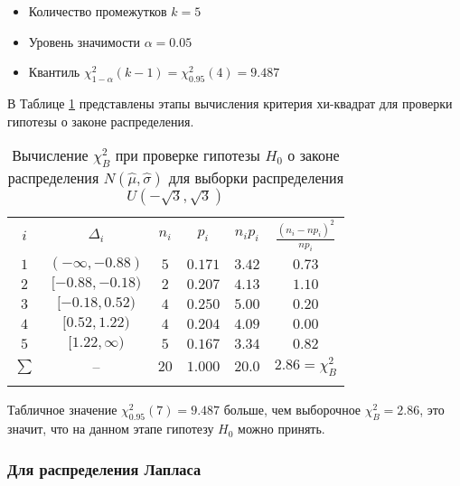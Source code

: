 \documentclass[12pt]{article}
\begin{document}
\begin{flushleft}
			\begin{itemize}
				\item Количество промежутков $k=5$
				\item Уровень значимости $\alpha = 0.05$
				\item Квантиль $\chi^2_{1-\alpha}(k-1) = \chi^2_{0.95}(4) = 9.487$
			\end{itemize}

			В Таблице \ref{chi_uni} представлены этапы вычисления критерия хи-квадрат для проверки гипотезы о законе распределения.

			\newpage

			\begin{table}[h]
				\begin{center}
					\caption{Вычисление $\chi^2_B$ при проверке гипотезы $H_0$ о законе распределения $N(\hat{\mu}, \hat{\sigma})$ для выборки распределения $U(-\sqrt{3}, \sqrt{3})$}
					\begin{tabular}{||c|*{4}{c|}c||} \hhline{|t:=:=:=:=:=:=:t|}
						$i$    & $\Delta_i$         & $n_i$ & $p_i$ & $n_ip_i$ & $\frac{(n_i-np_i)^2}{np_i}$ \\
						\hhline{|:=:=:=:=:=:=:|}
						$1$    & $(-\infty, -0.88)$ & $5$  & $0.171$ & $3.42$ & $0.73$ \\
						\hhline{||-|-|-|-|-|-||}
						$2$    & $[-0.88, -0.18)$   & $2$  & $0.207$ & $4.13$ & $1.10$ \\
						\hhline{||-|-|-|-|-|-||}
						$3$    & $[-0.18, 0.52)$    & $4$  & $0.250$ & $5.00$ & $0.20$ \\
						\hhline{||-|-|-|-|-|-||}
						$4$    & $[0.52, 1.22)$     & $4$  & $0.204$ & $4.09$ & $0.00$ \\
						\hhline{||-|-|-|-|-|-||}
						$5$    & $[1.22, \infty)$   & $5$  & $0.167$ & $3.34$ & $0.82$ \\
						\hhline{|:=:=:=:=:=:=:|}
						$\sum$ & --                 & $20$ & $1.000$ & $20.0$ & $2.86 = \chi^2_B$ \\
						\hhline{|b:=:=:=:=:=:=:b|}
					\end{tabular}
				\label{chi_uni}
				\end{center}
			\end{table}

			Табличное значение $\chi^2_{0.95}(7) = 9.487$ больше, чем выборочное $\chi^2_B = 2.86$, это значит, что на данном этапе гипотезу $H_0$ можно принять.

		\subsubsection{Для распределения Лапласа}


\end{flushleft}
\end{document}
